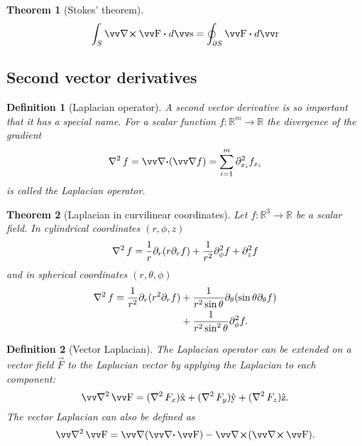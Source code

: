 \documentclass[margin=normal]{tex/hsrzf}
\theoremstyle{elmagzf}
\newtheorem{theorem}{Theorem}
\newtheorem{definition}{Definition}
\begin{document}
\begin{theorem}[Stokes' theorem]
  \[
    \int_S \curl \vec{F} \dotp d\vec{s}
    = \oint_{\partial S} \vec{F} \dotp d\vec{r}
  \]
\end{theorem}

\subsection{Second vector derivatives}

\begin{definition}[Laplacian operator]
  A second vector derivative is so important that it has a special name.  For a
  scalar function \(f: \mathbb{R}^m \to \mathbb{R}\) the divergence of the
  gradient
  \[
    \laplacian f = \div (\grad f) = \sum_{i=1}^m \partial_{x_i}^2 f_{x_i}
  \]
  is called the \emph{Laplacian operator}.
\end{definition}

\begin{theorem}[Laplacian in curvilinear coordinates]
  Let \(f: \mathbb{R}^3 \to \mathbb{R}\) be a scalar field. In cylindrical
  coordinates \((r,\phi,z)\)
  \[
    \operatorname{\nabla^2} f = \frac{1}{r} \partial_r (r \partial_r f)
      + \frac{1}{r^2} \partial_\phi^2 f
      + \partial_z^2 f
  \]
  and in spherical coordinates \((r,\theta,\phi)\)
  \begin{align*}
    \operatorname{\nabla^2} f = 
      \frac{1}{r^2} \partial_r ( r^2 \partial_r f)
      & + \frac{1}{r^2\sin\theta} \partial_\theta (\sin\theta \partial_\theta f) \\
      & + \frac{1}{r^2 \sin^2 \theta} \partial_\phi^2 f.
  \end{align*}
\end{theorem}

\begin{definition}[Vector Laplacian]
  The Laplacian operator can be extended on a vector field \(\vec{F}\) to the 
  \emph{Laplacian vector} by applying the Laplacian to each component:
  \[
    \vlaplacian \vec{F} 
      = (\laplacian F_x)\uvec{x} 
      + (\laplacian F_y)\uvec{y} 
      + (\laplacian F_z)\uvec{z} .
  \]
  The vector Laplacian can also be defined as
  \[
    \vlaplacian \vec{F} = \grad (\div \vec{F}) - \curl (\curl \vec{F}).
  \]
\end{definition}
\end{document}
